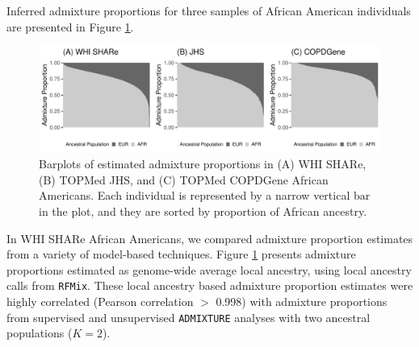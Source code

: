 \documentclass[12pt]{article}
\begin{document}
Inferred admixture proportions for three samples of African American individuals are presented in Figure \ref{fig:barplots}. 


\begin{figure}
\center
\includegraphics[width=\textwidth]{figs/barplots/barplots_greyscale}
\caption{Barplots of estimated admixture proportions in (A) WHI SHARe, (B) TOPMed JHS, and (C) TOPMed COPDGene African Americans. Each individual is represented by a narrow vertical bar in the plot, and they are sorted by proportion of African ancestry.}
\label{fig:barplots}
\end{figure}

In WHI SHARe African Americans, we compared admixture proportion estimates from a variety of model-based techniques. 
Figure \ref{fig:barplots} presents admixture proportions estimated as genome-wide average local ancestry, using local ancestry calls from \texttt{RFMix}. 
These local ancestry based admixture proportion estimates were highly correlated (Pearson correlation $>$ 0.998) with admixture proportions from supervised and unsupervised \texttt{ADMIXTURE} analyses with two ancestral populations ($K = 2$). 


\end{document}
